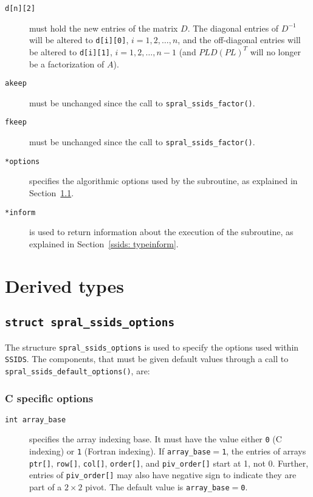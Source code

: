 \begin{description}

\item[\texttt{d[n][2]}] must hold the new entries of the matrix $D$.
   The diagonal entries of ${D}^{-1}$ will be altered to
   {\tt d[i][0]}, $i = 1,2,\ldots,n$, and the off-diagonal entries will be
   altered to {\tt d[i][1]}, $i = 1,2,\ldots,n-1$ (and $PLD(PL)^T$ will no
   longer be a factorization of $A$).

\item[\texttt{akeep}] must be unchanged since the call to
   {\tt spral\_ssids\_factor()}.

\item[\texttt{fkeep}] must be unchanged since the call to
   {\tt spral\_ssids\_factor()}.

\item[\texttt{*options}] specifies the algorithmic options used by the
   subroutine, as explained in Section~\ref{ssids: typeoptions}.

\item[\texttt{*inform}] is used to return information about the execution
   of the subroutine, as explained in Section~\ref{ssids: typeinform}.

\end{description}


\section{Derived types}
\subsection{\texttt{struct spral\_ssids\_options}}
\label{ssids: typeoptions}

The structure {\tt spral\_ssids\_options} is used to specify the options used
within \texttt{SSIDS}. The components, that must be given default values through
a call to \texttt{spral\_ssids\_default\_options()}, are: \\


\subsubsection*{C specific options}
\begin{description}
\item[\texttt{int array\_base}] specifies the array indexing base. It must
   have the value either \texttt{0} (C indexing) or \texttt{1} (Fortran
   indexing). If \texttt{array\_base}$=$\texttt{1}, the entries of arrays
   \texttt{ptr[]}, \texttt{row[]}, \texttt{col[]}, \texttt{order[]}, and
   \texttt{piv\_order[]} start at 1, not 0. Further, entries of
   \texttt{piv\_order[]} may also have negative sign to indicate they are
   part of a $2\times2$ pivot.
   The default value is \texttt{array\_base}$=$\texttt{0}.
\end{description}

